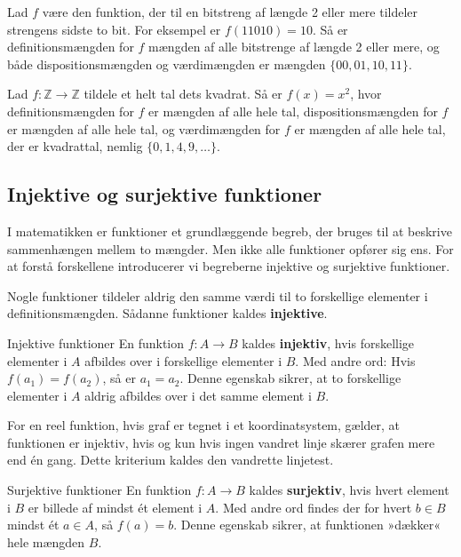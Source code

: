 \begin{example}
    Lad $f$ være den funktion, der til en bitstreng af længde 2 eller mere tildeler strengens sidste to bit. For eksempel er $f(11010)=10$. Så er definitionsmængden for $f$ mængden af alle bitstrenge af længde 2 eller mere, og både dispositionsmængden og værdimængden er mængden $\{00,01,10,11\}$.
\end{example}

\begin{example}
    Lad $f: \mathbb{Z} \rightarrow \mathbb{Z}$ tildele et helt tal dets kvadrat. Så er $f(x)=x^2$, hvor definitionsmængden for $f$ er mængden af alle hele tal, dispositionsmængden for $f$ er mængden af alle hele tal, og værdimængden for $f$ er mængden af alle hele tal, der er kvadrattal, nemlig $\{0,1,4,9, \ldots\}$.
\end{example}

\subsection*{Injektive og surjektive funktioner}
I matematikken er funktioner et grundlæggende begreb, der bruges til at beskrive sammenhængen mellem to mængder. Men ikke alle funktioner opfører sig ens. For at forstå forskellene introducerer vi begreberne injektive og surjektive funktioner.

Nogle funktioner tildeler aldrig den samme værdi til to forskellige elementer i definitionsmængden. Sådanne funktioner kaldes \textbf{injektive}.

\begin{definition} {Injektive funktioner}
En funktion \( f: A \rightarrow B \) kaldes \textbf{injektiv}, hvis forskellige elementer i \( A \) afbildes over i forskellige elementer i \( B \). Med andre ord: Hvis \( f(a_1) = f(a_2) \), så er \( a_1 = a_2 \). Denne egenskab sikrer, at to forskellige elementer i \( A \) aldrig afbildes over i det samme element i \( B \).     
\end{definition}

For en reel funktion, hvis graf er tegnet i et koordinatsystem, gælder, at funktionen er injektiv, hvis og kun hvis ingen vandret linje skærer grafen mere end én gang. Dette kriterium kaldes den vandrette linjetest.

\begin{definition}{Surjektive funktioner}
En funktion \( f: A \rightarrow B \) kaldes \textbf{surjektiv}, hvis hvert element i \( B \) er billede af mindst ét element i \( A \). Med andre ord findes der for hvert \( b \in B \) mindst ét \( a \in A \), så \( f(a) = b \). Denne egenskab sikrer, at funktionen »dækker« hele mængden \( B \).
\end{definition}

